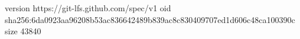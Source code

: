 version https://git-lfs.github.com/spec/v1
oid sha256:6da0923aa96208b53ac836642489b839ac8c830409707ed1d606c48ca100390c
size 43840
